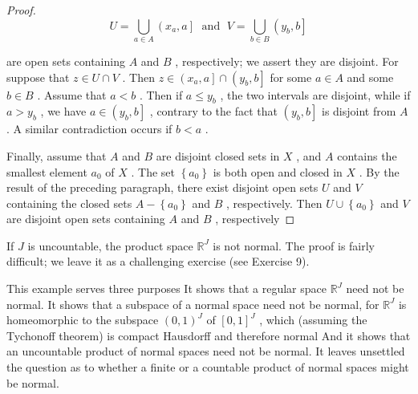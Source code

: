 \begin{proof}
\[
U = \mathop{\bigcup }\limits_{{a \in  A}}\left( {{x}_{a},a}\right\rbrack  \;\text{ and }\;V = \mathop{\bigcup }\limits_{{b \in  B}}\left( {{y}_{b},b}\right\rbrack
\]

are open sets containing \(A\) and \(B\) , respectively; we assert they are disjoint. For suppose that \(z \in  U \cap  V\) . Then \(z \in  \left( {{x}_{a},a}\right\rbrack   \cap  \left( {{y}_{b},b}\right\rbrack\) for some \(a \in  A\) and some \(b \in  B\) . Assume that \(a < b\) . Then if \(a \leq  {y}_{b}\) , the two intervals are disjoint, while if \(a > {y}_{b}\) , we have \(a \in  \left( {{y}_{b},b}\right\rbrack\) , contrary to the fact that \(\left( {{y}_{b},b}\right\rbrack\) is disjoint from \(A\) . A similar contradiction occurs if \(b < a\) .

Finally, assume that \(A\) and \(B\) are disjoint closed sets in \(X\) , and \(A\) contains the smallest element \({a}_{0}\) of \(X\) . The set \(\left\{  {a}_{0}\right\}\) is both open and closed in \(X\) . By the result of the preceding paragraph, there exist disjoint open sets \(U\) and \(V\) containing the closed sets \(A - \left\{  {a}_{0}\right\}\) and \(B\) , respectively. Then \(U \cup  \left\{  {a}_{0}\right\}\) and \(V\) are disjoint open sets containing \(A\) and \(B\) , respectively
\end{proof}

\begin{centeredblock}
\begin{example}
	If \(J\) is uncountable, the product space \({\mathbb{R}}^{J}\) is not normal. The proof is fairly difficult; we leave it as a challenging exercise (see Exercise 9).

This example serves three purposes It shows that a regular space \({\mathbb{R}}^{J}\) need not be normal. It shows that a subspace of a normal space need not be normal, for \({\mathbb{R}}^{J}\) is homeomorphic to the subspace \({\left( 0,1\right) }^{J}\) of \({\left\lbrack  0,1\right\rbrack  }^{J}\) , which (assuming the Tychonoff theorem) is compact Hausdorff and therefore normal And it shows that an uncountable product of normal spaces need not be normal. It leaves unsettled the question as to whether a finite or a countable product of normal spaces might be normal.
\end{example}
\end{centeredblock}

